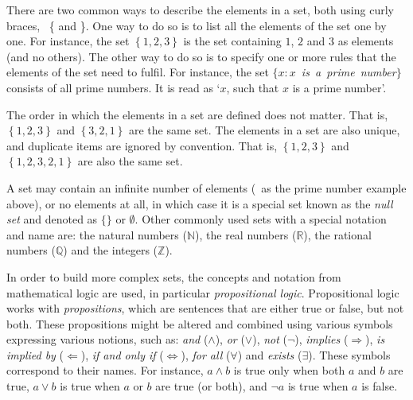 There are two common ways to describe the elements in a set, both using curly braces, \ie\ \{ and \}.
One way to do so is to list all the elements of the set one by one.
For instance, the set \(\left\{ 1,2,3 \right\}\) is the set containing \(1\), \(2\) and \(3\) as elements (and no others).
The other way to do so is to specify one or more rules that the elements of the set need to fulfil.
For instance, the set \(\{ x : x\)~\emph{is~a~prime~number}\(\}\) consists of all prime numbers.
It is read as `\(x\), such that \(x\) is a prime number'.

The order in which the elements in a set are defined does not matter.
That is, \(\left\{ 1,2,3 \right\}\) and \(\left\{ 3,2,1 \right\}\) are the same set.
The elements in a set are also unique, and duplicate items are ignored by convention.
That is, \(\left\{ 1,2,3 \right\}\) and \(\left\{ 1,2,3,2,1 \right\}\) are also the same set.

A set may contain an infinite number of elements (\eg\ as the prime number example above), or no elements at all, in which case it is a special set known as the \emph{null set} and denoted as \(\{ \}\) or \(\emptyset\).
Other commonly used sets with a special notation and name are: the natural numbers (\(\mathbb{N}\)), the real numbers (\(\mathbb{R}\)), the rational numbers (\(\mathbb{Q}\)) and the integers (\(\mathbb{Z}\)).

In order to build more complex sets, the concepts and notation from mathematical logic are used, in particular \emph{propositional logic}.
Propositional logic works with \emph{propositions}, which are sentences that are either true or false, but not both.
These propositions might be altered and combined using various symbols expressing various notions, such as: \emph{and} (\(\wedge\)), \emph{or} (\(\vee\)), \emph{not} (\(\neg\)), \emph{implies} (\(\Rightarrow\)), \emph{is implied by} (\(\Leftarrow\)), \emph{if and only if} (\(\Leftrightarrow\)), \emph{for all} (\(\forall\)) and \emph{exists} (\(\exists\)).
These symbols correspond to their names.
For instance, \(a \wedge b\) is true only when both \(a\) and \(b\) are true, \(a \vee b\) is true when \(a\) or \(b\) are true (or both), and \(\neg a\) is true when \(a\) is false.

